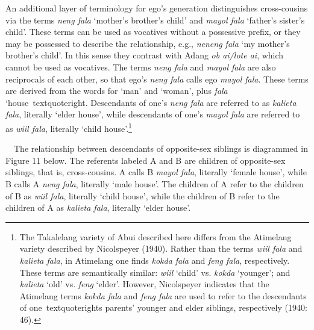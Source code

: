 An additional layer of terminology for ego{\textquoteright}s generation distinguishes cross-cousins via the terms \textit{neng fala }{\textquoteleft}mother{\textquoteright}s brother{\textquoteright}s child{\textquoteright} and \textit{mayol fala }{\textquoteleft}father{\textquoteright}s sister{\textquoteright}s child{\textquoteright}. These terms can be used as vocatives without a possessive prefix, or they may be possessed to describe the relationship, e.g., \textit{neneng fala} {\textquoteleft}my mother{\textquoteright}s brother{\textquoteright}s child{\textquoteright}. In this sense they contrast with Adang \textit{ob ai/lote ai}, which cannot be used as vocatives. The terms \textit{neng fala }and \textit{mayol fala }are also reciprocals of each other, so that ego{\textquoteright}s \textit{neng fala} calls ego \textit{mayol fala}. These terms are derived from the words for {\textquoteleft}man{\textquoteright} and {\textquoteleft}woman{\textquoteright}, plus \textit{fala }{\textquoteleft}house{\
textquoteright}. Descendants of one{\textquoteright}s \textit{neng fala} are referred to as \textit{kalieta fala}, literally {\textquoteleft}elder house{\textquoteright}, while descendants of one{\textquoteright}s \textit{mayol fala} are referred to as \textit{wiil fala}, literally {\textquoteleft}child house{\textquoteright}.\footnote{ The Takalelang variety of Abui described here differs from the Atimelang variety described by Nicolspeyer (1940). Rather than the terms \textit{wiil fala} and \textit{kalieta fala}, in Atimelang one finds \textit{kokda fala }and \textit{feng fala}, respectively. These terms are semantically similar: \textit{wiil }{\textquoteleft}child{\textquoteright} vs. \textit{kokda }{\textquoteleft}younger{\textquoteright}; and \textit{kalieta }{\textquoteleft}old{\textquoteright} vs. \textit{feng }{\textquoteleft}elder{\textquoteright}. However, Nicolspeyer indicates that the Atimelang terms \textit{kokda fala }and \textit{feng fala} are used to refer to the descendants of one{\
textquoteright}s parents{\textquoteright} younger and elder siblings, respectively (1940: 46). } 

\ \ The relationship between descendants of opposite-sex siblings is diagrammed in Figure 11 below. The referents labeled A and B are children of opposite-sex siblings, that is, cross-cousins. A calls B \textit{mayol fala}, literally {\textquoteleft}female house{\textquoteright}, while B calls A \textit{neng fala}, literally {\textquoteleft}male house{\textquoteright}. The children of A refer to the children of B as \textit{wiil fala}, literally {\textquoteleft}child house{\textquoteright}, while the children of B refer to the children of A as \textit{kalieta fala}, literally {\textquoteleft}elder house{\textquoteright}. 

